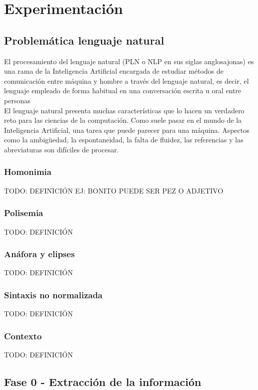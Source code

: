 \documentclass[../all.tex]{subfiles}
\begin{document}
\section{Experimentación} %

\subsection{Problemática lenguaje natural}
El procesamiento del lenguaje natural (PLN o NLP en sus siglas anglosajonas) es una rama de la Inteligencia Artificial encargada de estudiar métodos de comunicación entre máquina y hombre a través del lenguaje natural, es decir, el lenguaje empleado de forma habitual en una conversación escrita u oral entre personas\\ 
El lenguaje natural presenta muchas características que lo hacen un verdadero reto para las ciencias de la computación. Como suele pasar en el mundo de la Inteligencia Artificial, una tarea que puede parecer para una máquina. Aspectos como la ambigüedad, la espontaneidad, la falta de fluidez, las referencias y las abreviaturas son difíciles de procesar.

\subsubsection{Homonimia}
{\color{red} 
    TODO: DEFINICIÓN EJ: BONITO PUEDE SER PEZ O ADJETIVO
}
\subsubsection{Polisemia}
{\color{red} 
    TODO: DEFINICIÓN
}
\subsubsection{Anáfora y elipses}
{\color{red} 
    TODO: DEFINICIÓN
}
\subsubsection{Sintaxis no normalizada}
{\color{red} 
    TODO: DEFINICIÓN
}
\subsubsection{Contexto}
{\color{red} 
    TODO: DEFINICIÓN
}

\subsection{Fase 0 - Extracción de la información}
\end{document}

